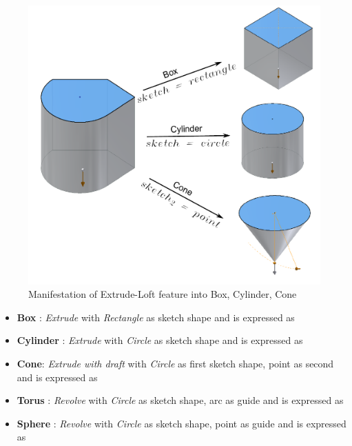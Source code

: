 \begin{figure}[htbp]
\centering
	\includegraphics[scale=0.55]{images//ExtrudeBoxCylCone.pdf} 
\caption{Manifestation of  Extrude-Loft feature into Box, Cylinder, Cone}
\label{fig:abstraction:boxcylconeasextrude}
\end{figure}


\begin{itemize}[noitemsep,topsep=2pt,parsep=2pt,partopsep=2pt]
\item {\bf Box} : {\em Extrude} with {\em Rectangle} as sketch shape and is expressed as 

\item {\bf Cylinder} : {\em Extrude} with {\em Circle} as sketch shape and is expressed as 

\item {\bf Cone}: {\em Extrude with draft} with {\em Circle} as first sketch shape, point as second and is expressed as 

\item {\bf Torus} : {\em Revolve} with {\em Circle} as sketch shape, arc as guide and is expressed as 

\item {\bf Sphere} : {\em Revolve} with {\em Circle} as sketch shape, point as guide and is expressed as

\end{itemize}

